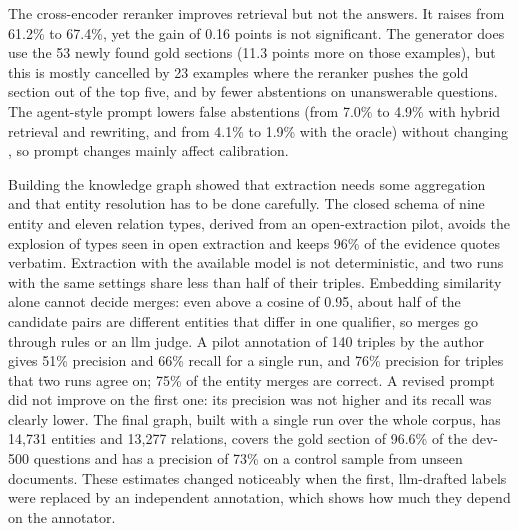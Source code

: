 The cross-encoder reranker improves retrieval but not the answers. It raises 
from 61.2\% to 67.4\%, yet the \fone{} gain of 0.16 points is not significant. The
generator does use the 53 newly found gold sections (11.3 points more \fone{} on those
examples), but this is mostly cancelled by 23 examples where the reranker pushes the gold
section out of the top five, and by fewer abstentions on unanswerable questions. The
agent-style prompt lowers false abstentions (from 7.0\% to 4.9\% with hybrid retrieval and
rewriting, and from 4.1\% to 1.9\% with the oracle) without changing \fone{}, so prompt
changes mainly affect calibration.

Building the knowledge graph showed that extraction needs some aggregation and that
entity resolution has to be done carefully. The closed schema of nine entity and eleven
relation types, derived from an open-extraction pilot, avoids the explosion of types seen
in open extraction and keeps 96\% of the evidence quotes verbatim. Extraction with the
available model is not deterministic, and two runs with the same settings share less
than half of their triples. Embedding similarity alone cannot decide merges: even above
a cosine of 0.95, about half of the candidate pairs are different entities that differ
in one qualifier, so merges go through rules or an \gls{llm} judge. A pilot annotation of
140 triples by the author gives 51\% precision and 66\% recall for a single run, and 76\%
precision for triples that two runs agree on; 75\% of the entity merges are correct. A
revised prompt did not improve on the first one: its precision was not higher and its
recall was clearly lower. The final graph, built with a single run over the whole corpus,
has 14{,}731 entities and 13{,}277 relations, covers the gold section of 96.6\% of the
dev-500 questions and has a precision of 73\% on a control sample from unseen documents.
These estimates changed noticeably when the first, \gls{llm}-drafted labels were replaced
by an independent annotation, which shows how much they depend on the annotator.


